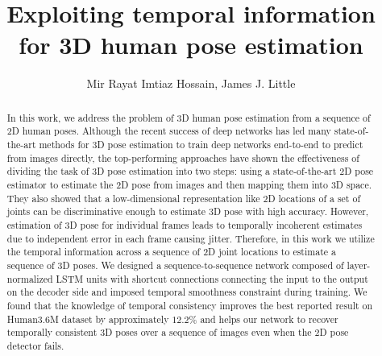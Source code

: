 \documentclass[runningheads]{llncs}
\begin{document}
\pagestyle{headings}
\mainmatter

\title{Exploiting temporal information for 3D human pose estimation} 






\author{Mir Rayat Imtiaz Hossain, James J. Little}





\maketitle

\begin{abstract}
 In this work, we address the problem of 3D human pose estimation from a sequence of 2D human poses. Although the recent success of deep networks has led many state-of-the-art methods for 3D pose estimation to train deep networks end-to-end to predict from images directly, the top-performing approaches have shown the effectiveness of dividing the task of 3D pose estimation into two steps: using a state-of-the-art 2D pose estimator to estimate the 2D pose from images and then mapping them into 3D space. They also showed that a low-dimensional representation like 2D locations of a set of joints can be discriminative enough to estimate 3D pose with high accuracy. However, estimation of 3D pose for individual frames leads to temporally incoherent estimates due to independent error in each frame causing jitter. Therefore, in this work we utilize the temporal information across a sequence of 2D joint locations to estimate a sequence of 3D poses. We designed a sequence-to-sequence network composed of layer-normalized LSTM units with shortcut connections connecting the input to the output on the decoder side and imposed temporal smoothness constraint during training. We found that the knowledge of temporal consistency improves the best reported result on Human3.6M dataset by approximately $12.2\%$ and helps our network to recover temporally consistent 3D poses over a sequence of images even when the 2D pose detector fails. 

\end{abstract}
\end{document}
